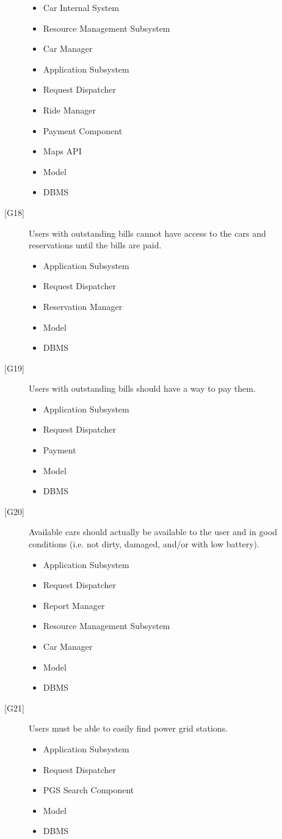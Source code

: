 \documentclass[english]{article}
\begin{document}
\begin{description}
	\begin{itemize}
		\item{Car Internal System}
		\item{Resource Management Subsystem}
		\item{Car Manager}
		\item{Application Subsystem}
		\item{Request Dispatcher}
		\item{Ride Manager}
		\item{Payment Component}
		\item{Maps API}
		\item{Model}
		\item{DBMS}
	\end{itemize}
	\item[{[G18]}]{Users with outstanding bills cannot have access to the cars and reservations until the bills are paid.}
	\begin{itemize}
		\item{Application Subsystem}
		\item{Request Dispatcher}
		\item{Reservation Manager}
		\item{Model}
		\item{DBMS}
	\end{itemize}
	\item[{[G19]}]{Users with outstanding bills should have a way to pay them.}
	\begin{itemize}
		\item{Application Subsystem}
		\item{Request Dispatcher}
		\item{Payment}
		\item{Model}
		\item{DBMS}
	\end{itemize}
	\item[{[G20]}]{Available cars should actually be available to the user and in good conditions (i.e. not dirty, damaged, and/or with low battery).}
	\begin{itemize}
		\item{Application Subsystem}
		\item{Request Dispatcher}
		\item{Report Manager}
		\item{Resource Management Subsystem}
		\item{Car Manager}
		\item{Model}
		\item{DBMS}
	\end{itemize}
	\item[{[G21]}]{Users must be able to easily find power grid stations.}
	\begin{itemize}
		\item{Application Subsystem}
		\item{Request Dispatcher}
		\item{PGS Search Component}
		\item{Model}
		\item{DBMS}
	\end{itemize}

\end{description}
\end{document}

